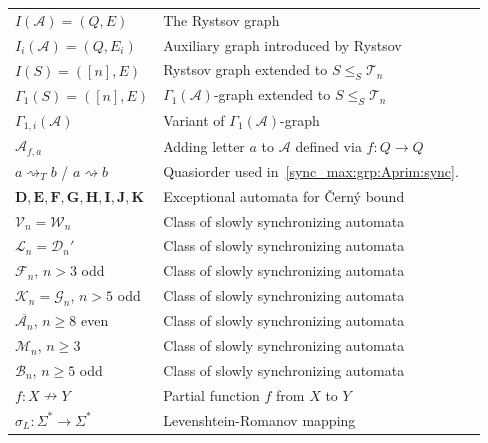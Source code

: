 \begin{longtable}{p{} p{} p{}}
    $I(\mathcal A) = (Q, E)$ & The Rystsov graph & \pageref{def:Rystsovgraph} \\
    $I_i(\mathcal A) = (Q, E_i)$ & Auxiliary graph introduced by Rystsov & \pageref{def:Rystsovgraph} \\    
	$I(S) = ([n], E)$                   & Rystsov graph extended to $S \le_S \mathcal T_n$ & \pageref{def:graph_IS} \\
	$\Gamma_1(S) = ([n], E)$ & $\Gamma_1(\mathcal A)$-graph extended to $S \le_S \mathcal T_n$ & \pageref{def:GammaS} \\
	$\Gamma_{1,i}(\mathcal A)$ & Variant of $\Gamma_1(\mathcal A)$-graph & \pageref{def:Gamma1i-graph} \\	
	$\mathcal A_{f,a}$ & Adding letter $a$ to $\mathcal A$ defined via $f \colon Q \to Q$ & \pageref{def:Afa} \\
	$a \rightsquigarrow_T b$ / $a \rightsquigarrow b$ & Quasiorder used in~\cref{sync_max:grp:Aprim:sync}. & \pageref{def:quasiorderidemp} \\
	$\mathbf{D},\mathbf{E},\mathbf{F},\mathbf{G},\mathbf{H},\mathbf{I},\mathbf{J},\mathbf{K}$ & Exceptional automata for \v{C}ern\'y bound & \pageref{def:exceptional_aut} \\
	$\mathcal V_n = \mathcal W_n$  & Class of slowly synchronizing automata & \pageref{def:Vn} \\
	$\mathcal L_n = \mathcal D_n'$ & Class of slowly synchronizing automata & \pageref{def:Ln} \\
	$\mathcal F_n$, $n > 3$ odd    & Class of slowly synchronizing automata & \pageref{def:Fn} \\
	$\mathcal K_n = \mathcal G_n$, $n > 5$ odd & Class of slowly synchronizing automata & \pageref{def:Kn} \\
		$\overline{\mathcal A_n}$, $n \ge 8$ even & Class of slowly synchronizing automata & \pageref{def:overlineAn} \\
		$\mathcal M_n$, $n \ge 3$              & Class of slowly synchronizing automata & \pageref{def:Mn}  \\
		$\mathcal B_n$, $n \ge 5$ odd &  Class of slowly synchronizing automata & \pageref{def:Bn} \\
		$f \colon X \nrightarrow Y$ & Partial function $f$ from $X$ to $Y$ & \pageref{def:partial_function}  \\
	$\sigma_L \colon \Sigma^* \to \Sigma^*$ & Levenshtein-Romanov mapping & \pageref{def:levenshtein-romanov-mapping} \\

\end{longtable}

